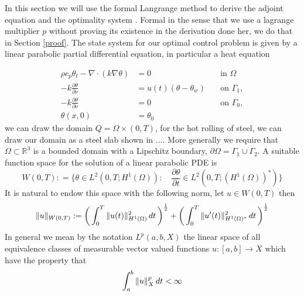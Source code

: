 
In this section we will use the formal Langrange method to derive the adjoint equation and the optimality system \cite{optimalControl}. Formal in the sense that we use a lagrange multiplier $p$ without proving its existence in the derivation done her, we do that in Section \ref{proof}. The state system for our optimal control problem is given by a linear parabolic partial differential equation, in particular a heat equation

\begin{align*}
      \rho c_p \theta_t - \nabla \cdot (k \nabla \theta) &= 0 \quad &\text{in } \Omega \\
      -k \frac{\partial \theta}{\partial \nu} &= u(t) (\theta - \theta_w) \quad &\text{on } \Gamma_1, \\
      -k \frac{\partial \theta}{\partial \nu} &= 0 \quad &\text{on } \Gamma_0, \\
      \theta(x, 0) &= \theta_0 &
\end{align*}
we can draw the domain $Q = \Omega \times (0,T)$, for the hot rolling of steel, we can draw our domain as a steel slab shown in .... More generally we require that $\Omega \subset \mathbb{R}^3$ is a bounded domain with a Lipschitz boundary, $\partial \Omega = \Gamma_1 \cup \Gamma_2$. A suitable function space for the solution of a linear parabolic PDE is 
\begin{equation}
    \label{eq:funcSpace}
    W(0,T) : = \{ \theta \in L^2(0,T;H^1(\Omega)) : \quad \frac{\partial \theta}{\partial t} \in L^2(0,T;(H^1(\Omega))^{*}) \}
\end{equation}
It is natural to endow this space with the following norm, let $u \in W(0,T)$ then 
\begin{equation*}
    \|u\|_{W(0,T)} := \bigg (\int_{0}^T\|u(t)\|^2_{H^{1}(\Omega)}\mathop{dt} \bigg ) ^{\frac{1}{2}} + \bigg (\int_{0}^T\|u'(t)\|^2_{H^{1}(\Omega)^{*}}\mathop{dt} \bigg ) ^{\frac{1}{2}}
\end{equation*}
In general we mean by the notation $L^{p}(a,b,X)$ the linear space of all equivalence classes of measurable vector valued functions $u:[a,b] \rightarrow X$ which have the property that
\begin{equation*}
    \int_{a}^b\|u\|_X^p \mathop{dt}<\infty
\end{equation*}

